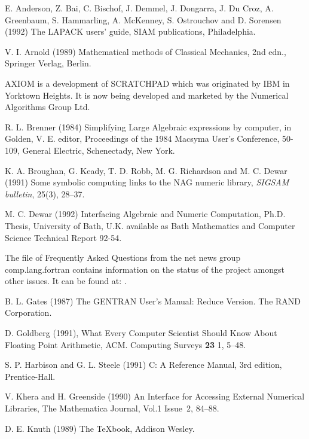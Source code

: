 \documentclass [12pt,twoside]{article}
\begin{document}
\begin{thebibliography}{999}

 E. Anderson, Z. Bai, C. Bischof, J. Demmel,
J. Dongarra, J. Du Croz, A. Greenbaum, S. Hammarling, A. McKenney,
S. Ostrouchov and D. Sorensen (1992) The LAPACK users' guide, SIAM
publications, Philadelphia.

 V. I. Arnold (1989) Mathematical methods of
Classical Mechanics, 2nd edn., Springer Verlag, Berlin.

 AXIOM is a development of SCRATCHPAD which was
originated by IBM in Yorktown Heights. It is now being developed and
marketed by the Numerical Algorithms Group Ltd.

 R. L. Brenner (1984) Simplifying Large Algebraic
expressions by computer, in Golden, V. E. editor, Proceedings of the
1984 Macsyma User's Conference, 50-109, General Electric,
Schenectady, New York.

 K. A. Broughan, G. Keady, T. D. Robb, M. G. Richardson
and M. C. Dewar (1991) Some symbolic computing links to the NAG numeric
library, {\it SIGSAM bulletin}, 25(3), 28--37.

 M. C. Dewar (1992) Interfacing Algebraic and Numeric
Computation, Ph.D. Thesis, University of Bath, U.K. available as Bath
Mathematics and Computer Science Technical Report 92-54.

 The file of Frequently Asked Questions from the net news group
comp.lang.fortran contains information on the status of the  project
amongst other issues. It can be found at:
.

 B. L. Gates (1987) The GENTRAN User's Manual:
Reduce Version. The RAND Corporation.

 D. Goldberg (1991), What Every Computer Scientist Should Know About
Floating Point Arithmetic, ACM. Computing Surveys {\bf 23} 1, 5--48.

 S. P. Harbison and G. L. Steele (1991) C: A
Reference Manual, 3rd edition, Prentice-Hall.

 V. Khera and H. Greenside (1990) An Interface for
Accessing External Numerical Libraries, The Mathematica Journal, Vol.1
Issue~2, 84--88.

 D. E. Knuth (1989) The TeXbook, Addison Wesley.


\end{thebibliography}
\end{document}
